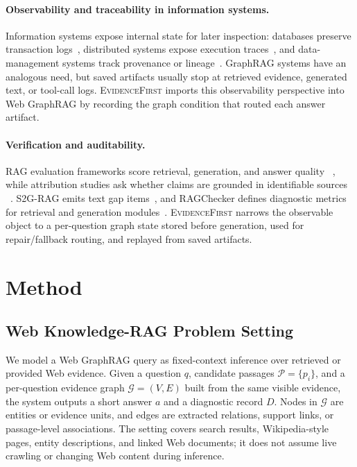 \documentclass[runningheads,a4paper]{llncs}
\newcommand{\sys}{\textsc{EvidenceFirst}\xspace}
\newcommand{\calG}{\mathcal{G}}
\newcommand{\calP}{\mathcal{P}}
\begin{document}
\paragraph{Observability and traceability in information systems.}
Information systems expose internal state for later inspection: databases
preserve transaction logs~\cite{mohan1992aries}, distributed systems expose
execution traces~\cite{sigelman2010dapper}, and data-management systems track
provenance or lineage~\cite{buneman2001why,cheney2009provenance}. GraphRAG
systems have an analogous need, but saved artifacts usually stop at retrieved
evidence, generated text, or tool-call logs. \sys imports this observability
perspective into Web GraphRAG by recording the graph condition that routed each
answer artifact.

\paragraph{Verification and auditability.}
RAG evaluation frameworks score retrieval, generation, and answer quality
~\cite{es2024ragas,saadfalcon2024ares,chen2024rgb,friel2024ragbench}, while
attribution studies ask whether claims are grounded in identifiable sources
~\cite{rashkin2023attribution,gao2023alce,wallat2024faithfulness}. S2G-RAG
emits text gap items~\cite{s2grag2026}, and RAGChecker defines diagnostic
metrics for retrieval and generation modules~\cite{ru2024ragchecker}. \sys
narrows the observable object to a per-question graph state stored before
generation, used for repair/fallback routing, and replayed from saved artifacts.

\section{Method}
\label{sec:method}

\subsection{Web Knowledge-RAG Problem Setting}

We model a Web GraphRAG query as fixed-context inference over retrieved or
provided Web evidence. Given a question $q$, candidate passages
$\calP=\{p_i\}$, and a per-question evidence graph $\calG=(V,E)$ built from the
same visible evidence, the system outputs a short answer $a$ and a diagnostic
record $D$. Nodes in $\calG$ are entities or evidence units, and edges are
extracted relations, support links, or passage-level associations. The setting
covers search results, Wikipedia-style pages, entity descriptions, and linked
Web documents; it does not assume live crawling or changing Web content during
inference.
\end{document}
